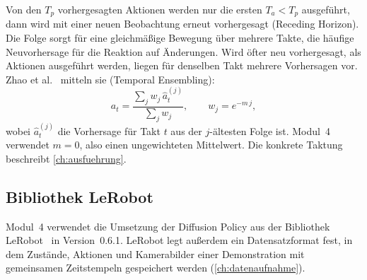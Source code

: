 Von den $T_p$ vorhergesagten Aktionen werden nur die ersten $T_a < T_p$ ausgeführt, dann
wird mit einer neuen Beobachtung erneut vorhergesagt (Receding Horizon). Die Folge sorgt für
eine gleichmäßige Bewegung über mehrere Takte, die häufige Neuvorhersage für die Reaktion auf
Änderungen. Wird öfter neu vorhergesagt, als Aktionen ausgeführt werden, liegen für denselben
Takt mehrere Vorhersagen vor. Zhao et al.~\cite{zhao2023} mitteln sie (Temporal Ensembling):
\begin{equation}
  a_t = \frac{\sum_{j} w_j\, \hat a_t^{(j)}}{\sum_j w_j},
  \qquad w_j = e^{-m\,j},
  \label{eq:ensemble}
\end{equation}
wobei $\hat a_t^{(j)}$ die Vorhersage für Takt $t$ aus der $j$-ältesten Folge ist. Modul~4
verwendet $m = 0$, also einen ungewichteten Mittelwert. Die konkrete Taktung beschreibt
\cref{ch:ausfuehrung}.

\subsection{Bibliothek LeRobot}

Modul~4 verwendet die Umsetzung der Diffusion Policy aus der Bibliothek
LeRobot~\cite{lerobot} in Version~0.6.1. LeRobot legt außerdem ein Datensatzformat fest, in
dem Zustände, Aktionen und Kamerabilder einer Demonstration mit gemeinsamen Zeitstempeln
gespeichert werden (\cref{ch:datenaufnahme}).
